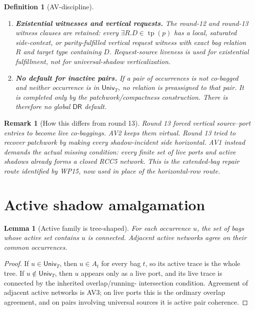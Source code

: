 \documentclass[11pt]{article}
\newtheorem{lemma}[theorem]{Lemma}
\newtheorem{definition}[theorem]{Definition}
\newtheorem{remark}[theorem]{Remark}
\newcommand{\DR}{\mathsf{DR}}
\newcommand{\tp}{\operatorname{tp}}
\newcommand{\Univ}{\mathsf{Univ}}
\begin{document}
\begin{definition}[AV-discipline]
\begin{enumerate}[label=(AV\arabic*),leftmargin=3.1em]
\item \textbf{Existential witnesses and vertical requests.}  The round-12 and
round-13 witness clauses are retained: every \(\exists R.D\in\tp(p)\) has a
local, saturated side-context, or parity-fulfilled vertical request witness
with exact bag relation \(R\) and target type containing \(D\).  Request-source
liveness is used for existential fulfillment, not for universal-shadow
verticalization.

\item \textbf{No default for inactive pairs.}  If a pair of occurrences is not
co-bagged and neither occurrence is in \(\Univ_T\), no relation is preassigned
to that pair.  It is completed only by the patchwork/compactness construction.
There is therefore no global \(\DR\) default.
\end{enumerate}
\end{definition}

\begin{remark}[How this differs from round 13]
Round 13 forced vertical source--port entries to become live co-baggings.  AV2
keeps them virtual.  Round 13 tried to recover patchwork by making every
shadow-incident side horizontal.  AV1 instead demands the actual missing
condition: every finite set of live ports and active shadows already forms a
closed RCC5 network.  This is the extended-bag repair route identified by WP15,
now used in place of the horizontal-row route.
\end{remark}

\section{Active shadow amalgamation}

\begin{lemma}[Active family is tree-shaped]\label{lem:active-tree}
For each occurrence \(u\), the set of bags whose active set contains \(u\) is
connected.  Adjacent active networks agree on their common occurrences.
\end{lemma}

\begin{proof}
If \(u\in\Univ_T\), then \(u\in A_t\) for every bag \(t\), so its active trace
is the whole tree.  If \(u\notin\Univ_T\), then \(u\) appears only as a live
port, and its live trace is connected by the inherited overlap/running-
intersection condition.  Agreement of adjacent active networks is AV3; on live
ports this is the ordinary overlap agreement, and on pairs involving universal
sources it is active pair coherence.
\end{proof}
\end{document}
